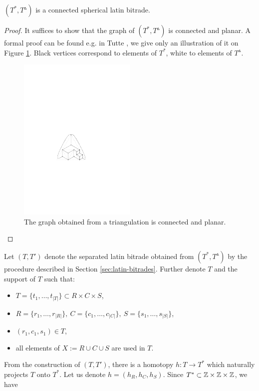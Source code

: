 \begin{lem}
$(T^*, T^\vartriangle)$ is a connected spherical latin bitrade.
\end{lem}
\begin{proof}
It suffices to show that the graph of $(T^*, T^\vartriangle)$ is connected and planar. A formal proof can be found e.g. in Tutte \cite{Tutte48}, we give only an illustration of it on Figure \ref{fig:triangulation-graph}. Black vertices correspond to elements of $T^*$, white to elements of $T^\vartriangle$.

\begin{figure}[htb]
\centering
\includegraphics[width=0.5\textwidth]{img/triangulation_graph.pdf}
\caption{The graph obtained from a triangulation is connected and planar.}
\label{fig:triangulation-graph}
\end{figure}
\end{proof}

Let $(T,T')$ denote the separated latin bitrade obtained from $(T^*, T^\vartriangle)$ by the procedure described in Section \ref{sec:latin-bitrades}. Further denote $T$ and the support of $T$ such that:
\begin{itemize}
	\item $T = \{t_1, \dots, t_{|T|}\} \subset R \times C \times S$,
	\item $R = \{r_1,\dots,r_{|R|}\},\ 
		C = \{c_1,\dots,c_{|C|}\},\ 
		S = \{s_1,\dots,s_{|S|}\}$,
	\item $(r_1,c_1,s_1) \in T$,
	\item all elements of $X := R \cup C \cup S$ are used in $T$.
\end{itemize}%
From the construction of $(T,T')$, there is a homotopy $h:T \rightarrow T^*$ which naturally projects $T$ onto $T^*$. Let us denote $h = (h_R, h_C, h_S)$. Since $T^* \subset \mathbb Z \times \mathbb Z \times \mathbb Z$, we have
\cosyalign{
	h_R: R \rightarrow \Z,\ h_C: C \rightarrow \Z,\ h_S: S \rightarrow \Z.
}%

